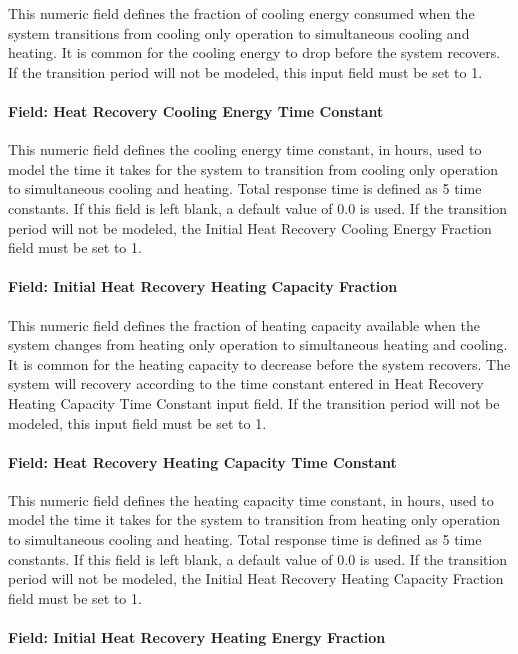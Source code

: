 This numeric field defines the fraction of cooling energy consumed when the system transitions from cooling only operation to simultaneous cooling and heating. It is common for the cooling energy to drop before the system recovers. If the transition period will not be modeled, this input field must be set to 1.

\paragraph{Field: Heat Recovery Cooling Energy Time Constant}

This numeric field defines the cooling energy time constant, in hours, used to model the time it takes for the system to transition from cooling only operation to simultaneous cooling and heating. Total response time is defined as 5 time constants. If this field is left blank, a default value of 0.0 is used. If the transition period will not be modeled, the Initial Heat Recovery Cooling Energy Fraction field must be set to 1.

\paragraph{Field: Initial Heat Recovery Heating Capacity Fraction}

This numeric field defines the fraction of heating capacity available when the system changes from heating only operation to simultaneous heating and cooling. It is common for the heating capacity to decrease before the system recovers. The system will recovery according to the time constant entered in Heat Recovery Heating Capacity Time Constant input field. If the transition period will not be modeled, this input field must be set to 1.

\paragraph{Field: Heat Recovery Heating Capacity Time Constant}

This numeric field defines the heating capacity time constant, in hours, used to model the time it takes for the system to transition from heating only operation to simultaneous cooling and heating. Total response time is defined as 5 time constants. If this field is left blank, a default value of 0.0 is used. If the transition period will not be modeled, the Initial Heat Recovery Heating Capacity Fraction field must be set to 1.

\paragraph{Field: Initial Heat Recovery Heating Energy Fraction}

